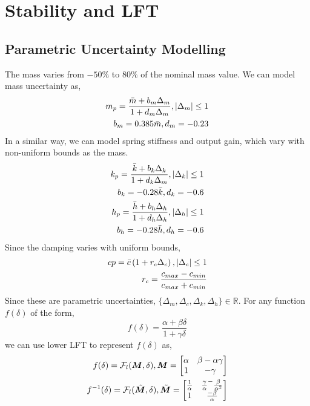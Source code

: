 \section{Stability and LFT}
\subsection{Parametric Uncertainty Modelling}
The mass varies from $-50\%$ to $80\%$ of the nominal mass value. We can model mass uncertainty as,
\begin{align*}
    m_p = \frac{\Bar{m} + b_m\Delta_m}{1 + d_m\Delta_m}, \left|\Delta_m\right| \le 1\\
    b_m = 0.385\Bar{m}, d_m = -0.23
\end{align*}
In a similar way, we can model spring stiffness and output gain, which vary with non-uniform bounds as the mass.
\begin{align*}
    k_p = \frac{\Bar{k} + b_k\Delta_k}{1 + d_k\Delta_m}, \left|\Delta_k\right| \le 1\\
    b_k = -0.28\Bar{k}, d_k = -0.6\\
    h_p = \frac{\Bar{h} + b_h\Delta_h}{1 + d_h\Delta_h}, \left|\Delta_h\right| \le 1\\
    b_h = -0.28\Bar{h}, d_h = -0.6
\end{align*}
Since the damping varies with uniform bounds,
\begin{align*}
    cp = \Bar{c}\left(1 + r_c\Delta_c\right), \left|\Delta_c\right| \le 1\\
    r_c = \frac{c_{max} - c_{min}}{c_{max} + c_{min}}
\end{align*}
Since these are parametric uncertainties, $\{\Delta_m,\Delta_c,\Delta_k,\Delta_h\} \in \mathbb{R}$. 
For any function $f(\delta)$ of the form,
$$f(\delta) = \frac{\alpha+\beta\delta}{1+\gamma\delta}$$
we can use lower LFT to represent $f(\delta)$ \cite{Fran01} as,
\begin{align*}
    f(\delta) = \mathcal{F}_l(\bm{M},\delta), \bm{M} = 
    \begin{bmatrix}
        \alpha & \beta-\alpha\gamma\\
        1 & -\gamma
    \end{bmatrix}\\
    f^{-1}(\delta) = \mathcal{F}_l(\Tilde{\bm{M}},\delta), \Tilde{\bm{M}} = 
    \begin{bmatrix}
        \frac{1}{\alpha} & \frac{\gamma}{\alpha}^- \frac{\beta}{\alpha^2}\\
        1 & \frac{-\beta}{\alpha}
    \end{bmatrix}
\end{align*}
